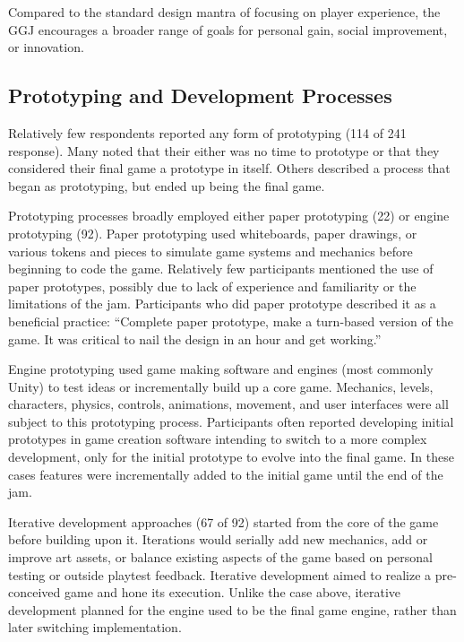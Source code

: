 \documentclass{sig-alternate}
\begin{document}
Compared to the standard design mantra of focusing on player experience, the GGJ encourages a broader range of goals for personal gain, social improvement, or innovation. 


\subsection{Prototyping and Development Processes}
Relatively few respondents reported any form of prototyping (114 of 241 response). Many noted that their either was no time to prototype or that they considered their final game a prototype in itself. Others described a process that began as prototyping, but ended up being the final game.

Prototyping processes broadly employed either paper prototyping (22) or engine prototyping (92).
Paper prototyping used whiteboards, paper drawings, or various tokens and pieces to simulate game systems and mechanics before beginning to code the game. Relatively few participants mentioned the use of paper prototypes, possibly due to lack of experience and familiarity or the limitations of the jam. Participants who did paper prototype described it as a beneficial practice:
``Complete paper prototype, make a turn-based version of the game. It was critical to nail the design in an hour and get working.''

Engine prototyping used game making software and engines (most commonly Unity) to test ideas or incrementally build up a core game. Mechanics, levels, characters, physics, controls, animations, movement, and user interfaces were all subject to this prototyping process. 
Participants often reported developing initial prototypes in game creation software intending to switch to a more complex development, only for the initial prototype to evolve into the final game. In these cases features were incrementally added to the initial game until the end of the jam.

Iterative development approaches (67 of 92) started from the core of the game before building upon it. Iterations would serially add new mechanics, add or improve art assets, or balance existing aspects of the game based on personal testing or outside playtest feedback.
Iterative development aimed to realize a pre-conceived game and hone its execution.
Unlike the case above, iterative development planned for the engine used to be the final game engine, rather than later switching implementation.
\end{document}
